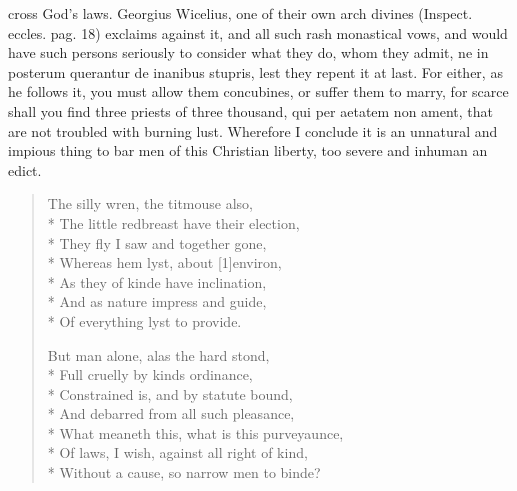cross God's laws. Georgius Wicelius, one of their own arch
divines (Inspect. eccles. pag. 18) exclaims against it, and all such
rash monastical vows, and would have such persons seriously to consider
what they do, whom they admit, ne in posterum querantur de inanibus
stupris, lest they repent it at last. For either, as he follows it,
you must allow them concubines, or suffer them to marry, for
scarce shall you find three priests of three thousand, qui per aetatem
non ament, that are not troubled with burning lust. Wherefore I
conclude it is an unnatural and impious thing to bar men of this
Christian liberty, too severe and inhuman an edict.
%
{\gothfont
\begin{verse}
The silly wren, the titmouse also,\\*
The little redbreast have their election,\\*
They fly I saw and together gone,\\*
Whereas hem lyst, about [1\baselineskip]environ,\\*
As they of kinde have inclination,\\*
And as nature impress and guide,\\*
Of everything lyst to provide.

But man alone, alas the hard stond,\\*
Full cruelly by kinds ordinance,\\*
Constrained is, and by statute bound,\\*
And debarred from all such pleasance,\\*
What meaneth this, what is this purveyaunce,\\*
Of laws, I wish, against all right of kind,\\*
Without a cause, so narrow men to binde?
\end{verse}
}

